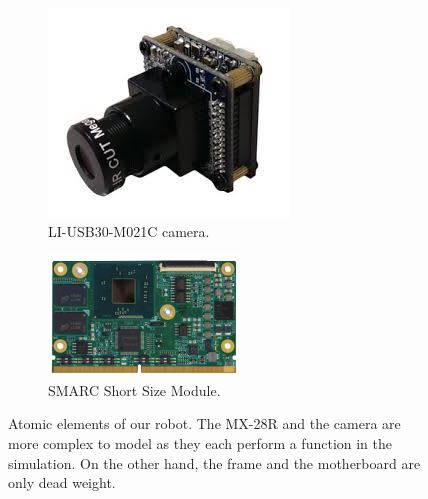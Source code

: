 \begin{figure}[htp]
    \begin{subfigure}[b]{0.4\textwidth}
    \center
    \includegraphics[width = \textwidth]{figures/li_cam}
    \caption{LI-USB30-M021C camera. \label{fig:li_cam}}
    \end{subfigure}
    \hfill
    \begin{subfigure}[b]{0.4\textwidth}
    \center
    \includegraphics[width = \textwidth]{figures/smarc}
    \caption{SMARC Short Size Module. \label{fig:smarc}}
    \end{subfigure}
    \caption[Atomic elements of our robot]{Atomic elements of our robot. The MX-28R and the camera are more complex to model as they each perform a function in the simulation. On the other hand, the frame and the motherboard are only dead weight.}
    \label{fig:modelling_problem}
\end{figure}

